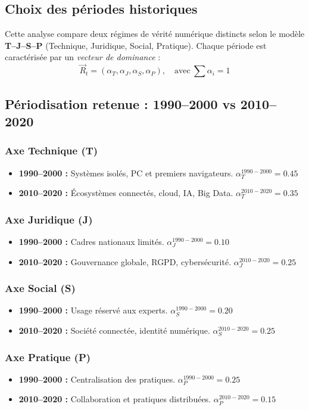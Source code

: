 \documentclass[a4paper,12pt]{report}
\begin{document}
	\subsection*{Choix des périodes historiques}
	Cette analyse compare deux régimes de vérité numérique distincts selon le modèle \textbf{T–J–S–P} (Technique, Juridique, Social, Pratique).
	Chaque période est caractérisée par un \textit{vecteur de dominance} :
	\[
	\vec{R}_t = (\alpha_T, \alpha_J, \alpha_S, \alpha_P), \quad \text{avec} \ \sum \alpha_i = 1
	\]
	
	\subsection*{Périodisation retenue : 1990--2000 vs 2010--2020}
	\subsubsection{Axe Technique (T)}
	\begin{itemize}
		\item \textbf{1990--2000 :} Systèmes isolés, PC et premiers navigateurs. $\alpha_T^{1990-2000} = 0.45$
		\item \textbf{2010--2020 :} Écosystèmes connectés, cloud, IA, Big Data. $\alpha_T^{2010-2020} = 0.35$
	\end{itemize}
	\subsubsection{Axe Juridique (J)}
	\begin{itemize}
		\item \textbf{1990--2000 :} Cadres nationaux limités. $\alpha_J^{1990-2000} = 0.10$
		\item \textbf{2010--2020 :} Gouvernance globale, RGPD, cybersécurité. $\alpha_J^{2010-2020} = 0.25$
	\end{itemize}
	\subsubsection{Axe Social (S)}
	\begin{itemize}
		\item \textbf{1990--2000 :} Usage réservé aux experts. $\alpha_S^{1990-2000} = 0.20$
		\item \textbf{2010--2020 :} Société connectée, identité numérique. $\alpha_S^{2010-2020} = 0.25$
	\end{itemize}
	\subsubsection{Axe Pratique (P)}
	\begin{itemize}
		\item \textbf{1990--2000 :} Centralisation des pratiques. $\alpha_P^{1990-2000} = 0.25$
		\item \textbf{2010--2020 :} Collaboration et pratiques distribuées. $\alpha_P^{2010-2020} = 0.15$
	\end{itemize}
	
\end{document}
